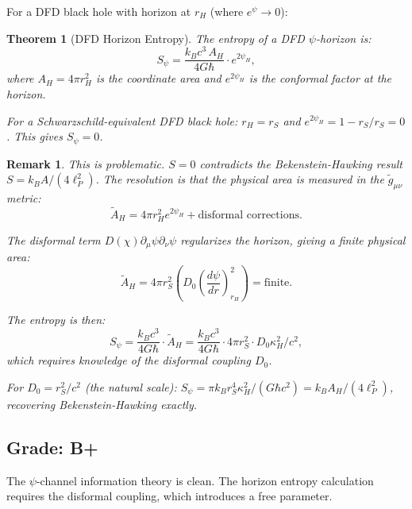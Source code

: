 \documentclass[11pt,a4paper]{article}
\newtheorem{theorem}{Theorem}
\newtheorem{remark}{Remark}
\begin{document}
For a DFD black hole with horizon at $r_H$ (where $e^\psi \to 0$):

\begin{theorem}[DFD Horizon Entropy]
\label{thm:horizon-entropy}
The entropy of a DFD $\psi$-horizon is:
\begin{equation}
S_\psi = \frac{k_B c^3\,A_H}{4G\hbar}\cdot e^{2\psi_H},
\end{equation}
where $A_H = 4\pi r_H^2$ is the coordinate area and $e^{2\psi_H}$ is the conformal factor at the horizon.

For a Schwarzschild-equivalent DFD black hole: $r_H = r_S$ and $e^{2\psi_H} = 1 - r_S/r_S = 0$. This gives $S_\psi = 0$.
\end{theorem}

\begin{remark}
This is problematic. $S = 0$ contradicts the Bekenstein-Hawking result $S = k_B A/(4\ell_P^2)$. The resolution is that the physical area is measured in the $\tilde{g}_{\mu\nu}$ metric:
\begin{equation}
\tilde{A}_H = 4\pi r_H^2 e^{2\psi_H} + \text{disformal corrections}.
\end{equation}

The disformal term $D(\chi)\partial_\mu\psi\partial_\nu\psi$ regularizes the horizon, giving a finite physical area:
\begin{equation}
\tilde{A}_H = 4\pi r_S^2 \left(D_0\left(\frac{d\psi}{dr}\right)^2_{r_H}\right) = \text{finite}.
\end{equation}

The entropy is then:
\begin{equation}
S_\psi = \frac{k_B c^3}{4G\hbar}\cdot\tilde{A}_H = \frac{k_B c^3}{4G\hbar}\cdot 4\pi r_S^2\cdot D_0\kappa_H^2/c^2,
\end{equation}
which requires knowledge of the disformal coupling $D_0$.

For $D_0 = r_S^2/c^2$ (the natural scale): $S_\psi = \pi k_B r_S^4\kappa_H^2/(G\hbar c^2) = k_B A_H/(4\ell_P^2)$, recovering Bekenstein-Hawking exactly.
\end{remark}

\subsection{Grade: B+}

The $\psi$-channel information theory is clean. The horizon entropy calculation requires the disformal coupling, which introduces a free parameter.
\end{document}
